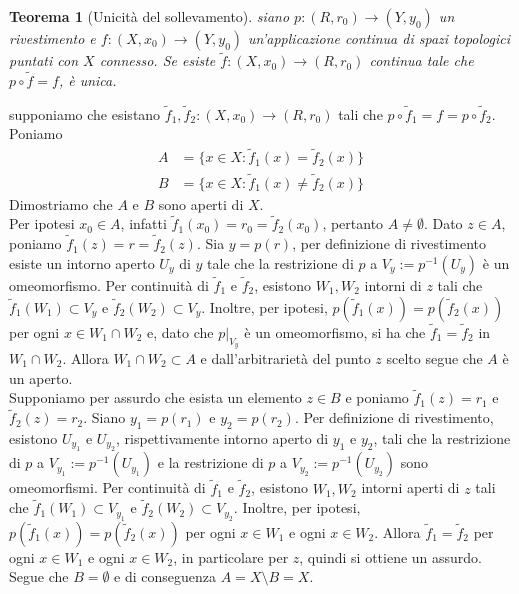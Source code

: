 \documentclass[twoside, 11pt]{amsbook}
\makeatletter
\newcommand{\0}{{(0)}}
\newcommand{\3}{{(3)}}
\theoremstyle{colonplain}
\newtheorem{thm}{Teorema}[chapter]
\theoremstyle{colondefinition}
\theoremstyle{colonremark}
\numberwithin{equation}{chapter}
\renewcommand{\proofname}{Dimostrazione}
\renewenvironment{proof}[1][\proofname]{\par
  \pushQED{\qed}%
  \normalfont \topsep6\p@\@plus6\p@\relax
  \trivlist
  \item[\hskip\labelsep\bfseries #1:]\ignorespaces
}{%
  \popQED\endtrivlist\@endpefalse
}
\makeatother
\begin{document}
\begin{thm}[Unicità del sollevamento]\label{UniqueLift} siano $p : (R, r_0) \longrightarrow (Y, y_0)$ un rivestimento e $f : (X, x_0) \longrightarrow (Y, y_0)$ un'applicazione continua di spazi topologici puntati con $X$ connesso. Se esiste $\tilde{f} : (X, x_0) \longrightarrow (R, r_0)$ continua tale che $p \circ \tilde{f} = f$, è unica.
\end{thm}

\begin{proof} supponiamo che esistano $\tilde{f}_1, \tilde{f}_2 : (X, x_0) \longrightarrow (R, r_0)$ tali che $p \circ \tilde{f}_1 = f = p \circ \tilde{f}_2$. \\
Poniamo 
\begin{align}
    A &= \{x \in X : \tilde{f}_1(x) = \tilde{f}_2(x)\}  \\
    B &= \{x \in X : \tilde{f}_1(x) \neq \tilde{f}_2(x)\} 
\end{align}
Dimostriamo che $A$ e $B$ sono aperti di $X$. \\
Per ipotesi $x_0 \in A$, infatti $\tilde{f}_1(x_0) = r_0 = \tilde{f}_2(x_0)$, pertanto $A \neq \emptyset$. Dato $z \in A$, poniamo $\tilde{f}_1(z) = r = \tilde{f}_2(z)$. Sia $y = p(r)$, per definizione di rivestimento esiste un intorno aperto $U_y$ di $y$ tale che la restrizione di $p$ a $V_y := p^{-1}(U_y)$ è un omeomorfismo. Per continuità di $\tilde{f}_1$ e $\tilde{f}_2$, esistono $W_1, W_2$ intorni di $z$ tali che $\tilde{f}_1(W_1) \subset V_y$ e $\tilde{f}_2(W_2) \subset V_y$. Inoltre, per ipotesi, $p(\tilde{f}_1(x)) = p(\tilde{f}_2(x))$ per ogni $x \in W_1 \cap W_2$ e, dato che $p|_{V_y}$ è un omeomorfismo, si ha che $\tilde{f}_1 = \tilde{f}_2$ in $W_1 \cap W_2$. Allora $W_1 \cap W_2 \subset A$ e dall'arbitrarietà del punto $z$ scelto segue che $A$ è un aperto. \\
Supponiamo per assurdo che esista un elemento $z \in B$ e poniamo $\tilde{f}_1(z) = r_1$ e $\tilde{f}_2(z) = r_2$. Siano $y_1 = p(r_1)$ e $y_2 = p(r_2)$. Per definizione di rivestimento, esistono $U_{y_1}$ e $U_{y_2}$, rispettivamente intorno aperto di $y_1$ e $y_2$, tali che la restrizione di $p$ a $V_{y_1} := p^{-1}(U_{y_1})$ e la restrizione di $p$ a $V_{y_2} := p^{-1}(U_{y_2})$ sono omeomorfismi. Per continuità di $\tilde{f}_1$ e $\tilde{f}_2$, esistono $W_1, W_2$ intorni aperti di $z$ tali che $\tilde{f}_1(W_1) \subset V_{y_1}$ e $\tilde{f}_2(W_2) \subset V_{y_2}$. Inoltre, per ipotesi, $p(\tilde{f}_1(x)) = p(\tilde{f}_2(x))$ per ogni $x \in W_1$ e ogni $x \in W_2$. Allora $\tilde{f}_1 = \tilde{f}_2$ per ogni $x \in W_1$ e ogni $x \in W_2$, in particolare per $z$, quindi si ottiene un assurdo. Segue che $B = \emptyset$ e di conseguenza $A = X \setminus B = X$. \end{proof}
\end{document}
